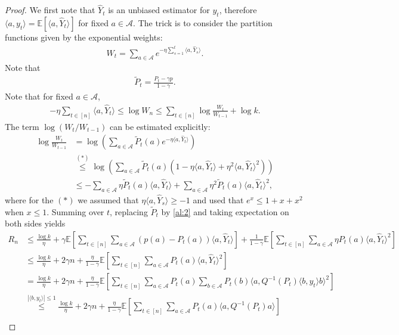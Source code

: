 \documentclass[letterpaper,11pt,openright,openany]{book}
\numberwithin{equation}{section}
\theoremstyle{plain}
\theoremstyle{definition}
\def\E{{\mathbb E}}
\begin{document}
\begin{proof}
We first note that $\hat{Y}_t$ is an unbiased estimator for $y_t$, therefore $\langle a,y_t\rangle = \E[\langle a, \hat{Y}_t\rangle]$ for fixed $a\in\mathcal A$. The trick is to consider the partition functions given by the exponential weights:
\begin{align*}
W_t = \sum_{a\in\mathcal A}e^{-\eta\sum_{s=1}^t\langle a, \hat{Y}_s\rangle}.
\end{align*}
Note that 
\begin{align}
\tilde{P}_t=\frac{P_t-\gamma p}{1-\gamma}.\label{al:2}
\end{align}
Note that for fixed $a\in\mathcal A$, 
\begin{align*}
-\eta\sum_{t\in [n]}\langle a, \hat{Y}_t\rangle\leq\log W_n\leq\sum_{t\in [n]}\log\frac{W_t}{W_{t-1}}+\log k.
\end{align*}
The term $\log(W_t/W_{t-1})$ can be estimated explicitly:
\begin{align*}
\log\frac{W_t}{W_{t-1}}&=\log\left(\sum_{a\in\mathcal A}\tilde{P}_t(a)e^{-\eta\langle a, \hat{Y}_t\rangle}\right)\\
&\stackrel{(*)}{\leq}\log\left(\sum_{a\in\mathcal A}\tilde{P}_t(a)(1-\eta\langle a, \hat{Y}_t\rangle+\eta^2 \langle a, \hat{Y}_t\rangle^2)\right)\\
&\leq -\sum_{a\in\mathcal A}\eta\tilde{P}_t(a)\langle a, \hat{Y}_t\rangle+\sum_{a\in\mathcal A}\eta^2 \tilde{P}_t(a)\langle a, \hat{Y}_t\rangle^2,
\end{align*}
where for the $(*)$ we assumed that $\eta\langle a, \hat{Y}_s\rangle\geq -1$ and used that $e^x\leq 1+x+x^2$ when $x\leq 1$. Summing over $t$, replacing $\tilde{P}_t$ by \eqref{al:2} and taking expectation on both sides yields
\begin{align*}
R_n&\leq\frac{\log k}{\eta}+\gamma\E\left[\sum_{t\in [n]}\sum_{a\in\mathcal A}(p(a)-P_t(a))\langle a, \hat{Y}_t\rangle\right]+\frac{1}{1-\gamma}\E\left[\sum_{t\in [n]}\sum_{a\in\mathcal A}\eta P_t(a)\langle a, \hat{Y}_t\rangle^2\right]\\
&\leq \frac{\log k}{\eta}+2\gamma n+\frac{\eta}{1-\gamma}\E\left[\sum_{t\in [n]}\sum_{a\in\mathcal A} P_t(a)\langle a, \hat{Y}_t\rangle^2\right]\\
&= \frac{\log k}{\eta}+2\gamma n+\frac{\eta}{1-\gamma}\E\left[\sum_{t\in [n]}\sum_{a\in\mathcal A} P_t(a)\sum_{b\in\mathcal A}P_t(b)\langle a, Q^{-1}(P_t)\langle b, y_t\rangle b\rangle^2\right]\\
&\stackrel{|\langle b, y_t\rangle|\leq 1}{\leq}\frac{\log k}{\eta}+2\gamma n+\frac{\eta}{1-\gamma}\E\left[\sum_{t\in [n]}\sum_{a\in\mathcal A} P_t(a)\langle a, Q^{-1}(P_t)a\rangle\right]\\

\end{align*}
\end{proof}
\end{document}
